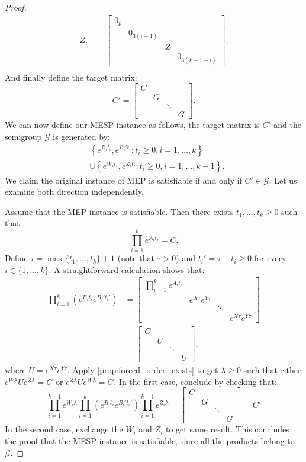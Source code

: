 \begin{proof}
\begin{align*}
Z_i&=\begin{bmatrix}0_p&&&\\&0_{3(i-1)}&&\\&&Z&\\&&&0_{3(k-1-i)}\end{bmatrix}.\\
\end{align*}
And finally define the target matrix:
\[C'=\begin{bmatrix}C&&&\\&G&&\\&&\ddots&\\&&&G\end{bmatrix}.\]
We can now define our MESP instance as follows, the target matrix is $C'$ and the semigroup $\mathcal{G}$
is generated by:
\begin{align*}
&\left\{e^{B_it_i},e^{B_i't_i}:t_i\geqslant0,i=1,\ldots,k\right\}\\
&\cup\left\{e^{W_it_i},e^{Z_it_i}:t_i\geqslant0,i=1,\ldots,k-1\right\}.
\end{align*}
We claim the original instance of MEP is satisfiable if and only if $C'\in\mathcal{G}$.
Let us examine both direction independently.

Assume that the MEP instance is satisfiable. Then there exists $t_1,\ldots,t_k\geqslant0$ such that:
\[\prod_{i=1}^ke^{A_it_i}=C.\]
Define $\tau=\max\{t_1,\ldots,t_k\}+1$ (note that $\tau>0$) and $t_i'=\tau-t_i\geqslant0$ for every $i\in\{1,\ldots,k\}$.
A straightforward calculation shows that:
\begin{align*}
\prod_{i=1}^k\left(e^{B_it_i}e^{B_i't_i'}\right)
    &=\begin{bmatrix}\prod_{i=1}^ke^{A_it_i}&&&\\&e^{X\tau}e^{Y\tau}&&\\&&\ddots&\\&&&e^{X\tau}e^{Y\tau}\end{bmatrix}\\
    &=\begin{bmatrix}C&&&\\&U&&\\&&\ddots&\\&&&U\end{bmatrix},
\end{align*}
where $U=e^{X\tau}e^{Y\tau}$. Apply \cref{prop:forced_order_exists} to get $\lambda\geqslant0$
such that either $e^{W\lambda}Ue^{Z\lambda}=G$ or $e^{Z\lambda}Ue^{W\lambda}=G$. In the first case, conclude by
checking that:
\[
\prod_{i=1}^{k-1}e^{W_i\lambda}\prod_{i=1}^k\left(e^{B_it_i}e^{B_i't_i'}\right)\prod_{i=1}^{k-1}e^{Z_i\lambda}
    =\begin{bmatrix}C&&&\\&G&&\\&&\ddots&\\&&&G\end{bmatrix}=C'
\]
In the second case, exchange the $W_i$ and $Z_i$ to get same result. This concludes the proof that
the MESP instance is satisfiable, since all the products belong to $\mathcal{G}$.


\end{proof}
